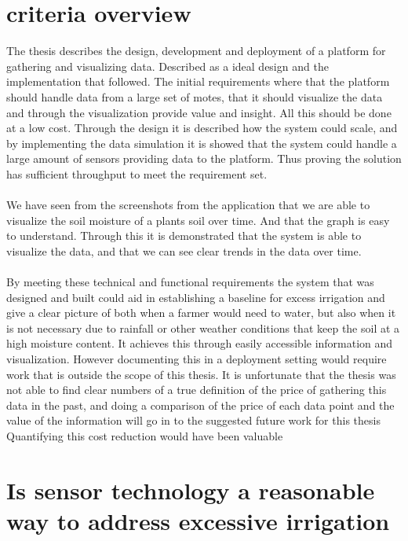 \documentclass[]{uiophd}
\begin{document}
\section{criteria overview}
The thesis describes the design, development and deployment of a platform for gathering and visualizing data. Described as a ideal design and the implementation that followed. The initial requirements where that the platform should handle data from a large set of motes, that it should visualize the data and through the visualization provide value and insight. All this should be done at a low cost. Through the design it is described how the system could scale, and by implementing the data simulation it is showed that the system could handle a large amount of sensors providing data to the platform. Thus proving the solution has sufficient throughput to meet the requirement set.
\\\\
We have seen from the screenshots from the application that we are able to visualize the soil moisture of a plants soil over time. And that the graph is easy to understand. Through this it is demonstrated that the system is able to visualize the data, and that we can see clear trends in the data over time.
\\\\
By meeting these technical and functional requirements the system that was  designed and built could aid in establishing a baseline for excess irrigation and give a clear picture of both when a farmer would need to water, but also when it is not necessary due to rainfall or other weather conditions that keep the soil at a high moisture content. It achieves this through easily accessible information and visualization. However documenting this in a deployment setting would require work that is outside the scope of this thesis. It is unfortunate that the thesis was not able to find clear numbers of a true definition of the price of gathering this data in the past, and doing a comparison of the price of each data point and the value of the information will go in to the suggested future work for this thesis Quantifying this cost reduction would have been valuable


\section{ Is sensor technology a reasonable way to address excessive irrigation}
\end{document}
